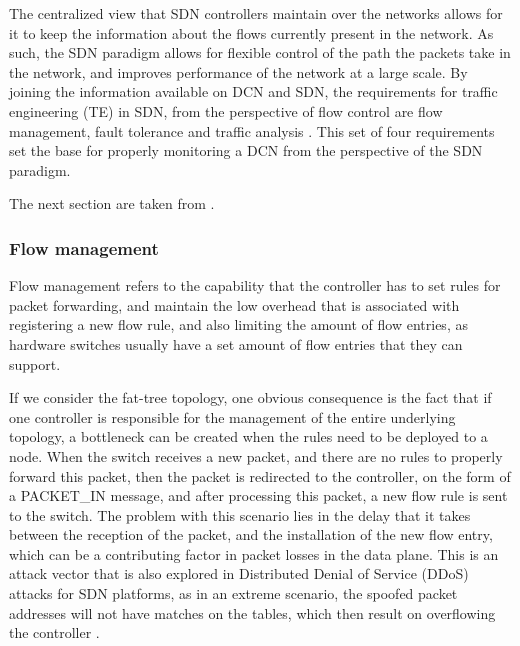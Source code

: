 \begin {enumerate}
\begin{enumerate}
\par The centralized view that SDN controllers maintain over the networks allows for it to keep the information about the flows currently present in the network. As
such, the SDN paradigm allows for flexible control of the path the packets take in the network, and improves performance of the network at a large
scale. By joining the information available on DCN and SDN, the requirements for traffic engineering (TE) in SDN, from the perspective of flow control are flow 
management, fault tolerance and traffic analysis \cite{akyildiz_research_2016}. This set of four requirements set the base for properly monitoring a DCN from the 
perspective of the SDN paradigm.
\par The next section are taken from \cite{akyildiz_research_2016}.

\subsubsection {Flow management}

Flow management refers to the capability that the controller has to set rules for packet forwarding, and maintain the low overhead that is associated with
registering a new flow rule, and also limiting the amount of flow entries, as hardware switches usually have a set amount of flow entries that they can support.

\par If we consider the fat-tree topology, one obvious consequence is the fact that if one controller is responsible for the management of the entire underlying 
topology, a bottleneck can be created when the rules need to be deployed to a node. When the switch receives a new packet, and there 
are no rules to properly forward this packet, then the packet is redirected to the controller, on the form of a \textsc{PACKET\_IN} message, and after processing
this packet, a new flow rule is sent to the switch. The problem with this scenario lies in the delay that it takes between the reception of the packet, and the
installation of the new flow entry, which can be a contributing factor in packet losses in the data plane. This is an attack vector that is also explored in
Distributed Denial of Service (DDoS) attacks for SDN platforms, as in an extreme scenario, the spoofed packet addresses will not have matches on the tables, which
then result on overflowing the controller \cite{mousavi_early_2015}.


\end{enumerate}
\end{enumerate}
